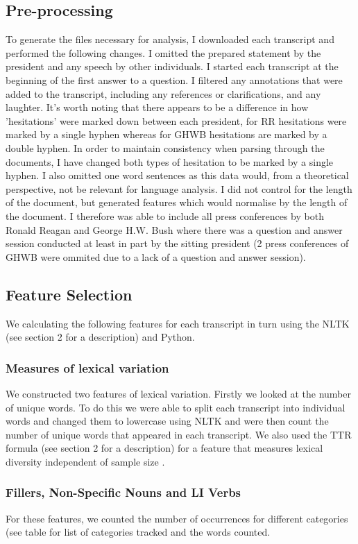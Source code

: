 \documentclass[10pt, letterpaper, twoside, openany]{book}
\begin{document}
\subsection{Pre-processing}
To generate the files necessary for analysis, I downloaded each transcript and performed the following changes. I omitted the prepared statement by the president and any speech by other individuals. I started each transcript at the beginning of the first answer to a question. I filtered any annotations that were added to the transcript, including any references or clarifications, and any laughter. It's worth noting that there appears to be a difference in how 'hesitations' were marked down between each president, for RR hesitations were marked by a single hyphen whereas for GHWB hesitations are marked by a double hyphen. In order to maintain consistency when parsing through the documents, I have changed both types of hesitation to be marked by a single hyphen. I also omitted one word sentences as this data would, from a theoretical perspective, not be relevant for language analysis. I did not control for the length of the document, but generated features which would normalise by the length of the document. I therefore was able to include all press conferences by both Ronald Reagan and George H.W. Bush where there was a question and answer session conducted at least in part by the sitting president (2 press conferences of GHWB were ommited due to a lack of a question and answer session).
\subsection{Feature Selection}
We calculating the following features for each transcript in turn using the NLTK (see section 2 for a description) \cite{Bird2009} and Python. 
\par 
\subsubsection{Measures of lexical variation}
We constructed two features of lexical variation. Firstly we looked at the number of unique words. To do this we were able to split each transcript into individual words and changed them to lowercase using NLTK and were then count the number of unique words that appeared in each transcript. We also used the TTR formula (see section 2 for a description) for a feature that measures lexical diversity independent of sample size \cite{}. 
\subsubsection{Fillers, Non-Specific Nouns and LI Verbs}
For these features, we counted the number of occurrences for different categories (see table for list of categories tracked and the words counted.
\end{document}
